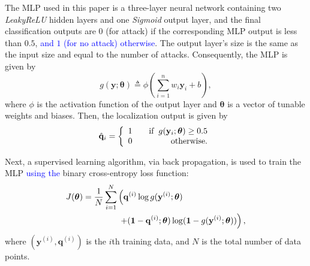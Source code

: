 The MLP used in this paper is a three-layer neural network containing two \emph{LeakyReLU} hidden layers and one \emph{Sigmoid} output layer, and the final classification outputs are $0$ (for attack) if the corresponding MLP output is less than $0.5$, \textcolor{blue}{and $1$ (for no attack) otherwise}. The output layer's size is the same as the input size and equal to the number of attacks. Consequently, the MLP is given by
\begin{equation}\label{equ:MLP}
    g(\mathbf{y}; \boldsymbol{\theta}) \triangleq \phi \left(\sum_{i=1}^{n} w_i\mathbf{y}_i+b\right),
\end{equation}
where $\phi$ is the activation function of the output layer and $\boldsymbol{\theta}$ is a vector of tunable weights and biases.
Then, the localization output is given by
\begin{equation}\label{equ:classification}
    \hat{\mathbf{q}}_i=\left\{
     \begin{array}{lr}
     1 &\quad\text{if}\hspace{0.2cm} g({\mathbf{y}}_i;\boldsymbol{\theta})\geq 0.5 \\
     0 &\quad\text{otherwise}.
     \end{array}
     \right.
\end{equation}
  
Next, a supervised learning algorithm, via back propagation, is used to train the MLP \textcolor{blue}{using the} binary cross-entropy loss function:
\begin{align}\nonumber
    J(\boldsymbol{\theta}) &= \frac{1}{N}\sum_{i=1}^N\left( \mathbf{q}^{(i)}\log g({\mathbf{y}^{(i)}};\boldsymbol{\theta}) \right.\\\label{equ:MLP_loss}  
    &\hspace{1.5cm}\left. +(\mathbf{1}-\mathbf{q}^{(i)};\boldsymbol{\theta}) \log (\mathbf{1}-g({\mathbf{y}^{(i)}};\boldsymbol{\theta}))\right),
\end{align}
where $(\mathbf{y}^{(i)}, \mathbf{q}^{(i)})$ is the $i$th training data, and $N$ is the total number of data points.



